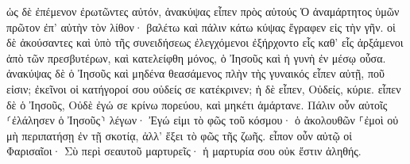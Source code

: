 \documentclass{openreader}
\begin{document}
ὡς δὲ ἐπέμενον ἐρωτῶντες αὐτόν, ἀνακύψας εἶπεν πρὸς αὐτούς Ὁ ἀναμάρτητος ὑμῶν πρῶτον ἐπ’ αὐτὴν τὸν λίθον· βαλέτω 
καὶ πάλιν κάτω κύψας ἔγραφεν εἰς τὴν γῆν. 
οἱ δὲ ἀκούσαντες καὶ ὑπὸ τῆς συνειδήσεως ἐλεγχόμενοι ἐξήρχοντο εἷς καθ’ εἷς ἀρξάμενοι ἀπὸ τῶν πρεσβυτέρων, καὶ κατελείφθη μόνος, ὁ Ἰησοῦς καὶ ἡ γυνὴ ἐν μέσῳ οὖσα. 
ἀνακύψας δὲ ὁ Ἰησοῦς καὶ μηδένα θεασάμενος πλὴν τὴς γυναικός εἶπεν αὐτῇ, ποῦ εἰσιν; ἐκεῖνοι οἱ κατήγοροί σου οὐδείς σε κατέκρινεν; 
ἡ δὲ εἶπεν, Οὐδείς, κύριε. εἶπεν δὲ ὁ Ἰησοῦς, Οὐδὲ ἐγώ σε κρίνω πορεύου, καὶ μηκέτι ἁμάρτανε. 
Πάλιν οὖν αὐτοῖς ⸂ἐλάλησεν ὁ Ἰησοῦς⸃ λέγων· Ἐγώ εἰμι τὸ φῶς τοῦ κόσμου· ὁ ἀκολουθῶν ⸀ἐμοὶ οὐ μὴ περιπατήσῃ ἐν τῇ σκοτίᾳ, ἀλλ’ ἕξει τὸ φῶς τῆς ζωῆς. 
εἶπον οὖν αὐτῷ οἱ Φαρισαῖοι· Σὺ περὶ σεαυτοῦ μαρτυρεῖς· ἡ μαρτυρία σου οὐκ ἔστιν ἀληθής. 
\end{document}
